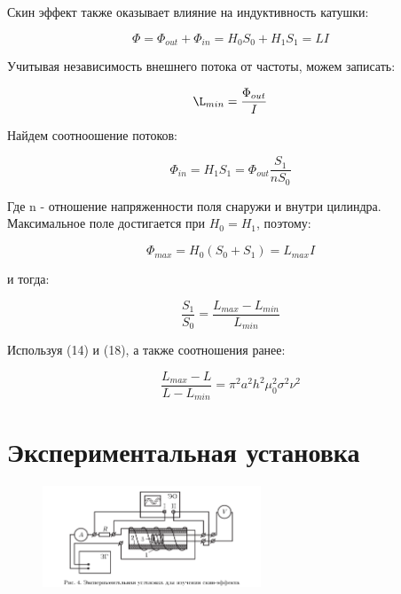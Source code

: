 \documentclass[a4paper,12pt]{article} %
\begin{document}
Скин эффект также оказывает влияние на индуктивность катушки:

\begin{equation}
	\Phi = \Phi_{out} + \Phi_{in} = H_0S_0 + H_1S_1 = LI
\end{equation}

Учитывая независимость внешнего потока от частоты, можем записать:

\begin{equation}
	\L_{min} = \frac{\Phi_{out}}{I}
\end{equation}

Найдем соотноошение потоков:

\begin{equation}
	\Phi_{in} = H_1S_1 = \Phi_{out}\frac{S_1}{nS_0}
\end{equation}

Где n - отношение напряженности поля снаружи и внутри цилиндра. Максимальное поле достигается при $H_0 = H_1$, поэтому:

\begin{equation}
	\Phi_{max} = H_0(S_0 + S_1) = L_{max}I
\end{equation}

и тогда:

\begin{equation}
	\frac{S_1}{S_0} = \frac{L_{max} - L_{min}}{L_{min}}
\end{equation}

Используя (14) и (18), а также соотношения ранее:

\begin{equation}
	\frac{L_{max} - L}{L - L_{min}} = \pi^2a^2h^2\mu_0^2\sigma^2\nu^2
\end{equation}


 

\section{Экспериментальная установка}

\begin{figure}
	\includegraphics[width=6.5cm]{Screenshot_3.png}
\end{figure}
\end{document}
